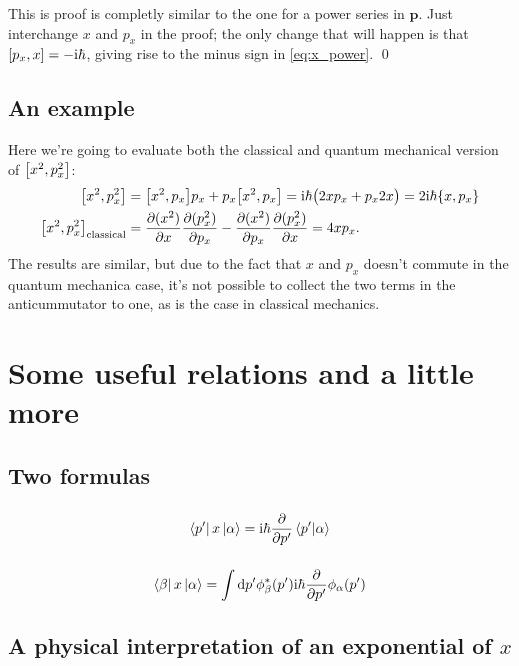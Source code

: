 \documentclass[11pt,letter, swedish, english
]{article}
\begin{document}
This is proof is completly similar to the one for a power series in
$\mathbf{p}$. Just interchange $x$ and $p_x$ in the proof; the only
change that will happen is that $\comm{p_x}{x}=-\ii\hbar$, giving rise
to the minus sign in \eqref{eq:x_power}.
\qed

\subsection{An example}
Here we're going to evaluate both the classical and quantum mechanical
version of $\comm{x^2}{p_x^2}$:
\begin{equation}
\begin{aligned}
\comm{x^2}{p_x^2} &= \comm{x^2}{p_x}p_x + p_x\comm{x^2}{p_x} 
= \ii\hbar \big( 2xp_x+p_x2x \big) = 2\ii\hbar\acomm{x}{p_x}\\
\comm{x^2}{p_x^2}_\text{classical} 
&= \pdv{(x^2)}{x}\pdv{(p_x^2)}{p_x} - \pdv{(x^2)}{p_x}\pdv{(p_x^2)}{x}
= 4xp_x.
\end{aligned}
\end{equation}
The results are similar, but due to the fact that $x$ and $p_x$
doesn't commute in the quantum mechanica case, it's not possible to
collect the two terms in the anticummutator to one, as is the case in
classical mechanics.



\section{Some useful relations and a little more}

\subsection{Two formulas}

\subsubsection{}
\begin{equation}
\bra{p'}x\ket{\alpha} = \mathrm{i}\hbar \pdv{p'} \braket{p'}{\alpha}
\end{equation}

\subsubsection{}
\begin{equation}
\bra{\beta}x\ket{\alpha} = \int \rd{p'} \phi^*_\beta(p')\ii\hbar \pdv{p'} \phi_\alpha(p')
\end{equation}



\subsection{A physical interpretation of an exponential of $x$}
\end{document}
